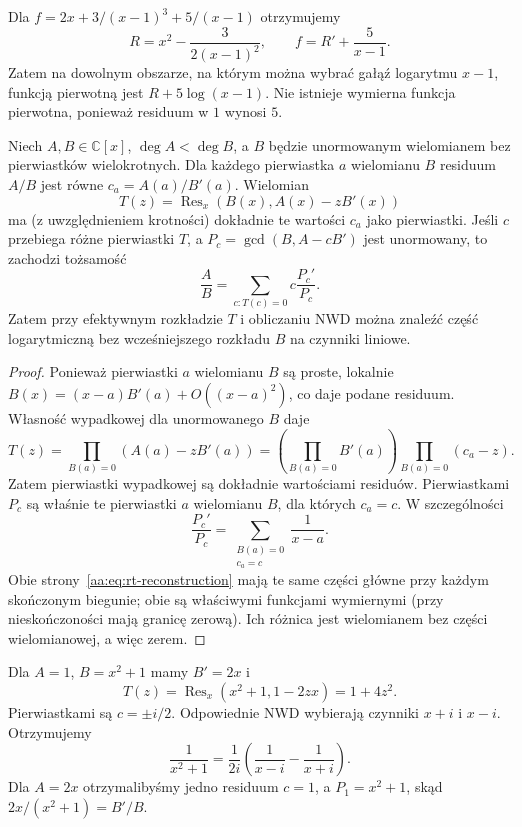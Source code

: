 \begin{przyklad}
\label{aa:prz:hermite-example}
Dla
$f=2x+3/(x-1)^3+5/(x-1)$
otrzymujemy
\[
 R=x^2-\frac{3}{2(x-1)^2},
 \qquad
 f=R'+\frac5{x-1}.
\]
Zatem na dowolnym obszarze,
na którym można wybrać gałąź
logarytmu $x-1$, funkcją
pierwotną jest
$R+5\log(x-1)$.
Nie istnieje wymierna funkcja
pierwotna, ponieważ residuum
w $1$ wynosi $5$.
\end{przyklad}

\begin{twierdzenie}
\label{aa:tw:rothstein-trager}
Niech $A,B\in\mathbb C[x]$,
$\deg A<\deg B$, a $B$ będzie
unormowanym wielomianem bez
pierwiastków wielokrotnych.
Dla każdego pierwiastka $a$ wielomianu
$B$ residuum $A/B$ jest równe
$c_a=A(a)/B'(a)$.
Wielomian
\begin{equation}\label{aa:eq:rt-resultant}
 T(z)=\operatorname{Res}_x(B(x),A(x)-zB'(x))
\end{equation}
ma (z uwzględnieniem krotności)
dokładnie te wartości $c_a$ jako pierwiastki.
Jeśli $c$ przebiega różne pierwiastki $T$,
a $P_c=\gcd(B,A-cB')$ jest unormowany,
to zachodzi tożsamość
\begin{equation}\label{aa:eq:rt-reconstruction}
 \frac{A}{B}=\sum_{c:T(c)=0}
              c\frac{P_c'}{P_c}.
\end{equation}
Zatem przy efektywnym rozkładzie
$T$ i obliczaniu NWD można znaleźć
część logarytmiczną bez wcześniejszego
rozkładu $B$ na czynniki liniowe.
\end{twierdzenie}
\begin{proof}
Ponieważ pierwiastki $a$ wielomianu $B$
są proste, lokalnie
$B(x)=(x-a)B'(a)+O((x-a)^2)$,
co daje podane residuum.
Własność wypadkowej dla
unormowanego $B$ daje
\[
 T(z)=\prod_{B(a)=0}
           (A(a)-zB'(a))
     =\left(\prod_{B(a)=0}B'(a)\right)
       \prod_{B(a)=0}(c_a-z).
\]
Zatem pierwiastki wypadkowej są
dokładnie wartościami residuów.
Pierwiastkami $P_c$ są właśnie
te pierwiastki $a$ wielomianu $B$,
dla których $c_a=c$. W szczególności
\[
 \frac{P_c'}{P_c}
 =\sum_{\substack{B(a)=0\\c_a=c}}
             \frac1{x-a}.
\]
Obie strony~\eqref{aa:eq:rt-reconstruction}
mają te same części główne
przy każdym skończonym biegunie;
obie są właściwymi funkcjami wymiernymi
(przy nieskończoności mają granicę
zerową). Ich różnica jest wielomianem
bez części wielomianowej, a więc zerem.
\end{proof}

\begin{przyklad}
\label{aa:prz:rt-example}
Dla $A=1$, $B=x^2+1$ mamy
$B'=2x$ i
\[
 T(z)=\operatorname{Res}_x(x^2+1,1-2zx)
     =1+4z^2.
\]
Pierwiastkami są $c=\pm i/2$.
Odpowiednie NWD wybierają czynniki
$x+i$ i $x-i$. Otrzymujemy
\[
 \frac1{x^2+1}
 =\frac1{2i}\left(\frac1{x-i}
                         -\frac1{x+i}\right).
\]
Dla $A=2x$ otrzymalibyśmy
jedno residuum $c=1$, a
$P_1=x^2+1$, skąd
$2x/(x^2+1)=B'/B$.
\end{przyklad}

